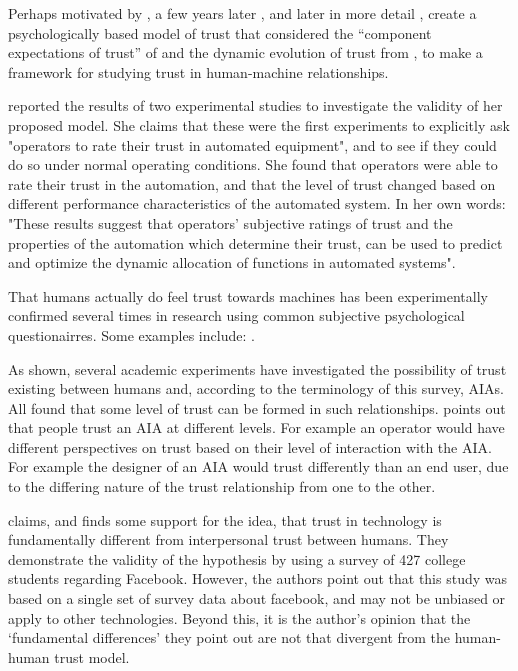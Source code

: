         Perhaps motivated by \citeauthor{Sheridan1984-kx}\cite{Sheridan1984-kx}, a few years later \cite{Muir1987-mk}, and later in more detail \cite{Muir1994-ow}, create a psychologically based model of trust that considered the ``component expectations of trust'' of \cite{Barber1983-yc} and the dynamic evolution of trust from \cite{Rempel1985-sg}, to make a framework for studying trust in human-machine relationships.
    
        \citet{Muir1996-gt} reported the results of two experimental studies to investigate the validity of her proposed model. She claims that these were the first experiments to explicitly ask "operators to rate their trust in automated equipment", and to see if they could do so under normal operating conditions. She found that operators were able to rate their trust in the automation, and that the level of trust changed based on different performance characteristics of the automated system. In her own words: "These results suggest that operators' subjective ratings of trust and the properties of the automation which determine their trust, can be used to predict and optimize the dynamic allocation of functions in automated systems".

        That humans actually do feel trust towards machines has been experimentally confirmed several times in research using common subjective psychological questionairres. Some examples include: \citet{Muir1996-gt,Reeves1997-ad,Groom2007-bz,Mcknight2011-gv,Riley1996-qm,Bainbridge2011-pl,Kaniarasu2012-mo,Salem2015-md,Desai2012-rc, Freedy2007-sg, Wang2016-id, Inagaki1998-cl, Kaniarasu2013-ho}.

        As shown, several academic experiments have investigated the possibility of trust existing between humans and, according to the terminology of this survey, AIAs. All found that some level of trust can be formed in such relationships. \citet{Lacher2014-yc} points out that people trust an AIA at different levels. For example an operator would have different perspectives on trust based on their level of interaction with the AIA. For example the designer of an AIA would trust differently than an end user, due to the differing nature of the trust relationship from one to the other.

        \citet{Lankton2008-ct} claims, and finds some support for the idea, that trust in technology is fundamentally different from interpersonal trust between humans. They demonstrate the validity of the hypothesis by using a survey of 427 college students regarding Facebook. However, the authors point out that this study was based on a single set of survey data about facebook, and may not be unbiased or apply to other technologies. Beyond this, it is the author's opinion that the `fundamental differences' they point out are not that divergent from the human-human trust model.

